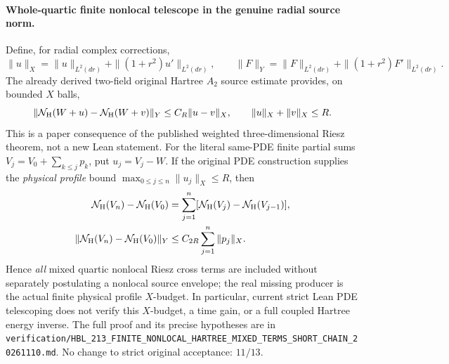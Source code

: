 \documentclass[11pt]{amsart}
\begin{document}
\paragraph{Whole-quartic finite nonlocal telescope in the genuine radial source norm.}
Define, for radial complex corrections,
\[
 \|u\|_X=\|u\|_{L^2(dr)}
       +\|(1+r^2)u'\|_{L^2(dr)},\qquad
 \|F\|_Y=\|F\|_{L^2(dr)}
       +\|(1+r^2)F'\|_{L^2(dr)}.
\]
The already derived two-field original Hartree \(A_2\)
source estimate provides, on bounded \(X\) balls,
\[
 \|\mathcal N_{\rm H}(W+u)-\mathcal N_{\rm H}(W+v)\|_Y
 \le C_R\|u-v\|_X,\qquad
 \|u\|_X+\|v\|_X\le R.
\]
This is a paper consequence of the published
weighted three-dimensional Riesz theorem, not a
new Lean statement. For the literal same-PDE finite
partial sums \(V_j=V_0+\sum_{k\le j}p_k\),
put \(u_j=V_j-W\). If the original PDE construction
supplies the \emph{physical profile} bound
\(\max_{0\le j\le n}\|u_j\|_X\le R\), then
\[
 \begin{aligned}
 \mathcal N_{\rm H}(V_n)-\mathcal N_{\rm H}(V_0)
   &=\sum_{j=1}^n[
     \mathcal N_{\rm H}(V_j)-\mathcal N_{\rm H}(V_{j-1})],\\
 \|\mathcal N_{\rm H}(V_n)-\mathcal N_{\rm H}(V_0)\|_Y
   &\le C_{2R}\sum_{j=1}^n\|p_j\|_X.
 \end{aligned}
\]
Hence \emph{all} mixed quartic nonlocal Riesz cross
terms are included without separately postulating a
nonlocal source envelope; the real missing producer
is the actual finite physical profile \(X\)-budget.
In particular, current strict Lean PDE telescoping
does not verify this \(X\)-budget, a time gain, or a
full coupled Hartree energy inverse. The full proof
and its precise hypotheses are in
\texttt{verification/HBL\_213\_FINITE\_NONLOCAL\_HARTREE\_MIXED\_TERMS\_SHORT\_CHAIN\_20261110.md}.
No change to strict original acceptance: \(11/13\).
\end{document}
